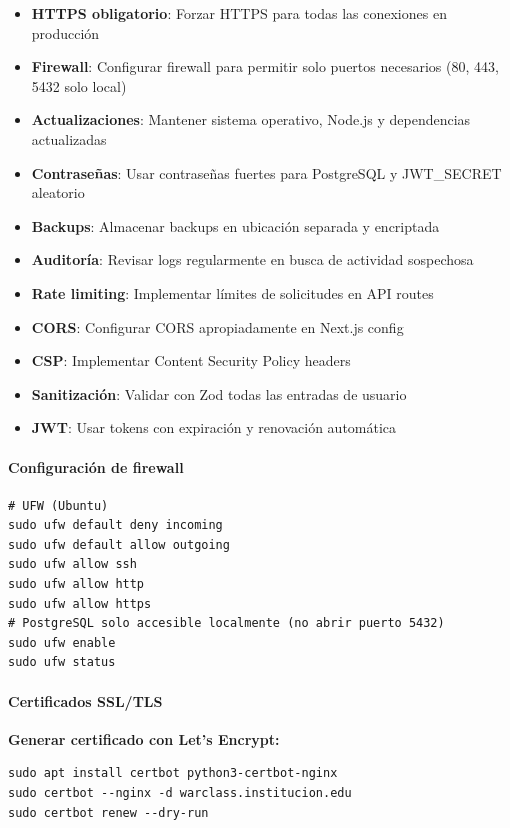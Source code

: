 \begin{itemize}
	\item \textbf{HTTPS obligatorio}: Forzar HTTPS para todas las conexiones en producción
	\item \textbf{Firewall}: Configurar firewall para permitir solo puertos necesarios (80, 443, 5432 solo local)
	\item \textbf{Actualizaciones}: Mantener sistema operativo, Node.js y dependencias actualizadas
	\item \textbf{Contraseñas}: Usar contraseñas fuertes para PostgreSQL y JWT\_SECRET aleatorio
	\item \textbf{Backups}: Almacenar backups en ubicación separada y encriptada
	\item \textbf{Auditoría}: Revisar logs regularmente en busca de actividad sospechosa
	\item \textbf{Rate limiting}: Implementar límites de solicitudes en API routes
	\item \textbf{CORS}: Configurar CORS apropiadamente en Next.js config
	\item \textbf{CSP}: Implementar Content Security Policy headers
	\item \textbf{Sanitización}: Validar con Zod todas las entradas de usuario
	\item \textbf{JWT}: Usar tokens con expiración y renovación automática
\end{itemize}

\paragraph{Configuración de firewall}

\begin{verbatim}
# UFW (Ubuntu)
sudo ufw default deny incoming
sudo ufw default allow outgoing
sudo ufw allow ssh
sudo ufw allow http
sudo ufw allow https
# PostgreSQL solo accesible localmente (no abrir puerto 5432)
sudo ufw enable
sudo ufw status
\end{verbatim}

\paragraph{Certificados SSL/TLS}

\textbf{Generar certificado con Let's Encrypt:}

\begin{verbatim}
sudo apt install certbot python3-certbot-nginx
sudo certbot --nginx -d warclass.institucion.edu
sudo certbot renew --dry-run
\end{verbatim}

